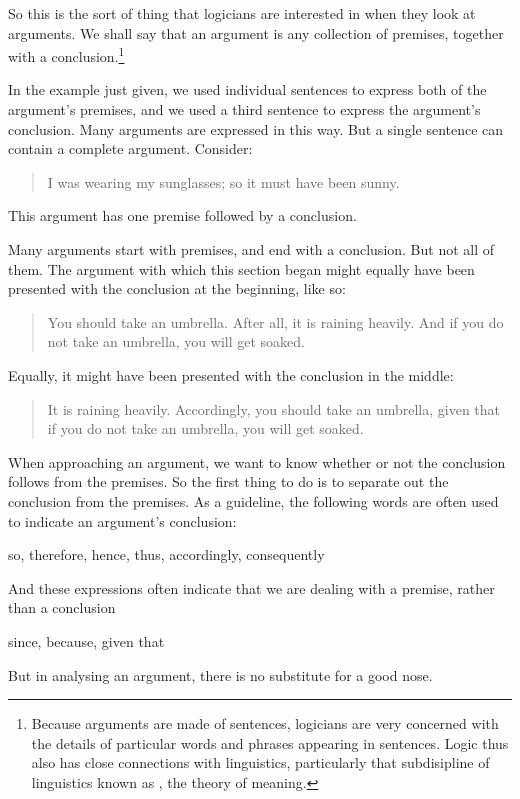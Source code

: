 So this is the sort of thing that logicians are interested in when they look at arguments. We shall say that an argument is any collection of premises, together with a conclusion.\footnote{Because arguments are made of sentences, logicians are very concerned with the details of particular words and phrases appearing in sentences. Logic thus also has close connections with linguistics, particularly that subdisipline of linguistics known as , the theory of meaning.}

In the example just given, we used individual sentences to express both of the argument's premises, and we used a third sentence to express the argument's conclusion. Many arguments are expressed in this way. But a single sentence can contain a complete argument. Consider:
	\begin{quote}
		 I was wearing my sunglasses; so it must have been sunny.
	\end{quote}
This argument has one premise followed by a conclusion. 

Many arguments start with premises, and end with a conclusion. But not all of them. The argument with which this section began might equally have been presented with the conclusion at the beginning, like so:
	\begin{quote}
		You should take an umbrella. After all, it is raining heavily. And if you do not take an umbrella, you will get soaked. 
	\end{quote}
Equally, it might have been presented with the conclusion in the middle:
	\begin{quote}
		It is raining heavily. Accordingly, you should take an umbrella, given that if you do not take an umbrella, you will get soaked.
	\end{quote}
When approaching an argument, we want to know whether or not the conclusion follows from the premises. So the first thing to do is to separate out the conclusion from the premises. As a guideline, the following words are often used to indicate an argument's conclusion:
	\begin{center}
		so, therefore, hence, thus, accordingly, consequently
	\end{center}
And these expressions often indicate that we are dealing with a premise, rather than a conclusion
	\begin{center}
		since, because, given that
	\end{center}
But in analysing an argument, there is no substitute for a good nose.

